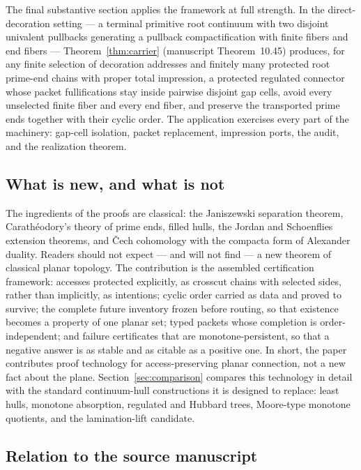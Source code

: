 The final substantive section applies the framework at full strength.  In
the direct-decoration setting --- a terminal primitive root continuum with
two disjoint univalent pullbacks generating a pullback compactification with
finite fibers and end fibers --- Theorem~\ref{thm:carrier} (manuscript
Theorem~10.45) produces, for any finite selection of decoration addresses
and finitely many protected root prime-end chains with proper total
impression, a protected regulated connector whose packet fullifications stay
inside pairwise disjoint gap cells, avoid every unselected finite fiber and
every end fiber, and preserve the transported prime ends together with their
cyclic order.  The application exercises every part of the machinery:
gap-cell isolation, packet replacement, impression ports, the audit, and the
realization theorem.

\subsection{What is new, and what is not}\label{subsec:A-honest}

The ingredients of the proofs are classical: the Janiszewski separation
theorem, Carath\'eodory's theory of prime ends, filled hulls, the Jordan and
Schoenflies extension theorems, and \v{C}ech cohomology with the compacta
form of Alexander duality.  Readers should not expect --- and will not
find --- a new theorem of classical planar topology.  The contribution is
the assembled certification framework: accesses protected explicitly, as
crosscut chains with selected sides, rather than implicitly, as intentions;
cyclic order carried as data and proved to survive; the complete future
inventory frozen before routing, so that existence becomes a property of one
planar set; typed packets whose completion is order-independent; and failure
certificates that are monotone-persistent, so that a negative answer is as
stable and as citable as a positive one.  In short, the paper contributes
proof technology for access-preserving planar connection, not a new fact
about the plane.  Section~\ref{sec:comparison} compares this technology in
detail with the standard continuum-hull constructions it is designed to
replace: least hulls, monotone absorption, regulated and Hubbard trees,
Moore-type monotone quotients, and the lamination-lift candidate.

\subsection{Relation to the source manuscript}\label{subsec:A-source}

